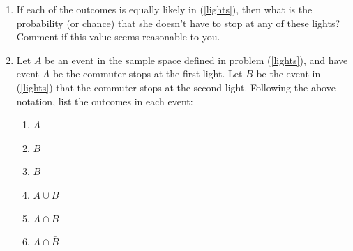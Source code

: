 \documentclass[10pt]{article}
\newcommand{\ansfont}[1]{{\textcolor{blue}{\textbf{Answer:}}\ \ #1}}
\renewcommand{\ansfont}[1]{}
\begin{document}
\begin{enumerate}
\begin{enumerate}
      \item %
        If each of the outcomes is equally likely in (\ref{lights}), then
        what is the probability (or chance) that she doesn't have to stop at any of these lights?
        Comment if  this value seems reasonable to you.

      \item \label{eventlights}
        Let $A$ be an event in the sample space defined in problem (\ref{lights}),
        and have event $A$ be the commuter stops at the first light.
        Let $B$ be the event in (\ref{lights}) that the commuter stops at the second light.
        Following the above notation, list the outcomes in each event:
        \begin{enumerate}
          \item $A$
          \item $B$
          \item $\bar{B}$
          \item $A \cup B$
          \item $A \cap B$
          \item $A \cap \bar{B}$
        \end{enumerate}
    \end{enumerate}
    \ansfont{
      \begin{enumerate}
        \item Following the above notation, the set of all outcomes is
          \[\Omega = \{ccc, ccs, css, csc, sss, ssc, scc, scs\}.\]
        \item
          The outcome of her not stopping at any light is $ccc$. This is one outcome
          out of the possible 8, so the probability of this is 
          \[P(\{ccc\}) = \frac{\mathcal{N}_F}{\mathcal{N}_T}=\frac18.
          \]
          This probability (.125) is reasonable--it's the value if stopping at any light is independent
          of any of the others. In perspective, a value of .95 or .01 would seem unreasonable.
        \item
          \begin{enumerate}
            \item
              {$A=\{sss, ssc, scc, scs\}$.}
            \item
              {$B=\{sss, ssc, css, csc\}$.}
            \item
              {$\bar{B}=\Omega\setminus B = \{ccc, ccs, scc, scs\}$.}
            \item
              {$A\cup B=\{sss, ssc, scc, scs, css, csc\}$.}
            \item
              {$A\cap B=\{sss, ssc\}$.}
            \item
              {$A\cap \bar{B}=\{scc, scs\}$.}
          \end{enumerate}
      \end{enumerate}
    }


\end{enumerate}
\end{document}

